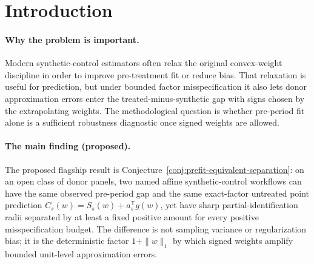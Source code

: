 \documentclass[11pt]{article}
\newcommand{\transpose}{\mathsf{T}}
\theoremstyle{definition}
\theoremstyle{plain}
\theoremstyle{remark}
\begin{document}
\begin{abstract}
Synthetic-control practice increasingly uses regression, ridge, and augmented weights that can extrapolate outside the donor convex hull. This proposal asks for the sharp treatment-effect interval implied by a bounded unit-level factor-approximation error when the weights are fixed but may be signed. The proposed kernel is that misspecification uncertainty is multiplied by the exact affine extrapolation factor \(1+\|w\|_1\), so two named synthetic-control workflows with the same pre-period fit can have different sharp partial-identification intervals. The routine theorems give the Chebyshev bridge interval and a \texttt{scpi}-compatible deterministic radius report, while the flagship conjecture states an open-set pre-fit-equivalence separation between convex and signed workflow outputs. If resolved, the result would turn extrapolation in synthetic control from an estimator-stability concern into a sharp identification diagnostic that must be reported alongside RMSPE and probabilistic prediction intervals.
\end{abstract}

\section{Introduction}
\paragraph{Why the problem is important.}
Modern synthetic-control estimators often relax the original convex-weight discipline in order to improve pre-treatment fit or reduce bias. That relaxation is useful for prediction, but under bounded factor misspecification it also lets donor approximation errors enter the treated-minus-synthetic gap with signs chosen by the extrapolating weights. The methodological question is whether pre-period fit alone is a sufficient robustness diagnostic once signed weights are allowed.

\paragraph{The main finding (proposed).}
The proposed flagship result is Conjecture~\ref{conj:prefit-equivalent-separation}: on an open class of donor panels, two named affine synthetic-control workflows can have the same observed pre-period gap and the same exact-factor untreated point prediction \(C_s(w)=S_s(w)+a_s^\transpose g(w)\), yet have sharp partial-identification radii separated by at least a fixed positive amount for every positive misspecification budget. The difference is not sampling variance or regularization bias; it is the deterministic factor \(1+\|w\|_1\) by which signed weights amplify bounded unit-level approximation errors.
\end{document}
